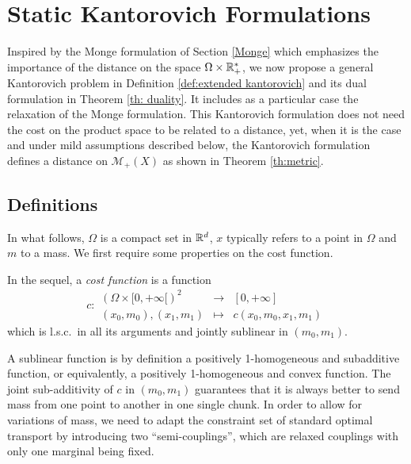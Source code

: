 
\section{Static Kantorovich Formulations}
\label{sec : general static problem}

Inspired by the Monge formulation of Section \ref{Monge} which emphasizes the importance of the distance on the space $\Omega \times \mathbb{R}^*_+$, we now propose a general Kantorovich problem in Definition \ref{def:extended kantorovich} and its dual formulation in Theorem \ref{th: duality}. It includes as a particular case the relaxation of the Monge formulation. This Kantorovich formulation does not need the cost on the product space to be related to a distance, yet, when it is the case and under mild assumptions described below, the Kantorovich formulation defines a distance on $\mathcal{M}_+(X)$ as shown in Theorem \ref{th:metric}.

\subsection{Definitions}
In what follows, $\Omega$ is a compact set in $\mathbb{R}^d$, $x$ typically refers to a point in $\Omega$ and $m$ to a mass. We first require some properties on the cost function.


\begin{definition}
	\label{def:CostFunction}
	In the sequel, a \emph{cost function} is a function 
	\[
		c : 
		\begin{array}{lcl}
			(\Omega \times [0, + \infty[) ^2 &\to & [0,+ \infty] \\
			(x_0,m_0),(x_1,m_1) &\mapsto &c(x_0,m_0,x_1,m_1)
		\end{array}
	\]
which is l.s.c.\ in all its arguments and jointly sublinear in $(m_0, m_1)$.
\end{definition}

A sublinear function is by definition a positively 1-homogeneous and subadditive function, or equivalently, a positively 1-homogeneous and convex function. The joint sub-additivity of $c$ in $(m_0,m_1)$ guarantees that it is always better to send mass from one point to another in one single chunk. In order to allow for variations of mass, we need to adapt the constraint set of standard optimal transport by introducing two ``semi-couplings'', which are relaxed couplings with only one marginal being fixed. 

